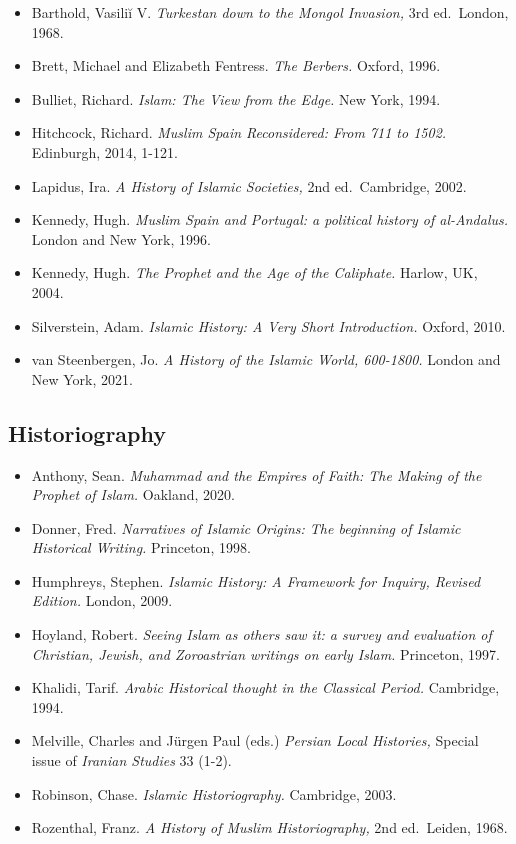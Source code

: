 \documentclass[
]{book}
\providecommand{\tightlist}{%
  \setlength{\itemsep}{0pt}\setlength{\parskip}{0pt}}
\begin{document}
\begin{itemize}
\tightlist
\item
  Barthold, Vasiliĭ V. \emph{Turkestan down to the Mongol Invasion,} 3rd ed.~London, 1968.
\item
  Brett, Michael and Elizabeth Fentress. \emph{The Berbers.} Oxford, 1996.
\item
  Bulliet, Richard. \emph{Islam: The View from the Edge.} New York, 1994.
\item
  Hitchcock, Richard. \emph{Muslim Spain Reconsidered: From 711 to 1502.} Edinburgh, 2014, 1-121.
\item
  Lapidus, Ira. \emph{A History of Islamic Societies,} 2nd ed.~Cambridge, 2002.
\item
  Kennedy, Hugh. \emph{Muslim Spain and Portugal: a political history of al-Andalus.} London and New York, 1996.
\item
  Kennedy, Hugh. \emph{The Prophet and the Age of the Caliphate.} Harlow, UK, 2004.
\item
  Silverstein, Adam. \emph{Islamic History: A Very Short Introduction.} Oxford, 2010.
\item
  van Steenbergen, Jo. \emph{A History of the Islamic World, 600-1800.} London and New York, 2021.
\end{itemize}

\hypertarget{historiography}{%
\subsection*{Historiography}\label{historiography}}

\begin{itemize}
\tightlist
\item
  Anthony, Sean. \emph{Muhammad and the Empires of Faith: The Making of the Prophet of Islam.} Oakland, 2020.
\item
  Donner, Fred. \emph{Narratives of Islamic Origins: The beginning of Islamic Historical Writing.} Princeton, 1998.
\item
  Humphreys, Stephen. \emph{Islamic History: A Framework for Inquiry, Revised Edition.} London, 2009.
\item
  Hoyland, Robert. \emph{Seeing Islam as others saw it: a survey and evaluation of Christian, Jewish, and Zoroastrian writings on early Islam.} Princeton, 1997.
\item
  Khalidi, Tarif. \emph{Arabic Historical thought in the Classical Period.} Cambridge, 1994.
\item
  Melville, Charles and Jürgen Paul (eds.) \emph{Persian Local Histories,} Special issue of \emph{Iranian Studies} 33 (1-2).
\item
  Robinson, Chase. \emph{Islamic Historiography.} Cambridge, 2003.
\item
  Rozenthal, Franz. \emph{A History of Muslim Historiography,} 2nd ed.~Leiden, 1968.
\end{itemize}
\end{document}
